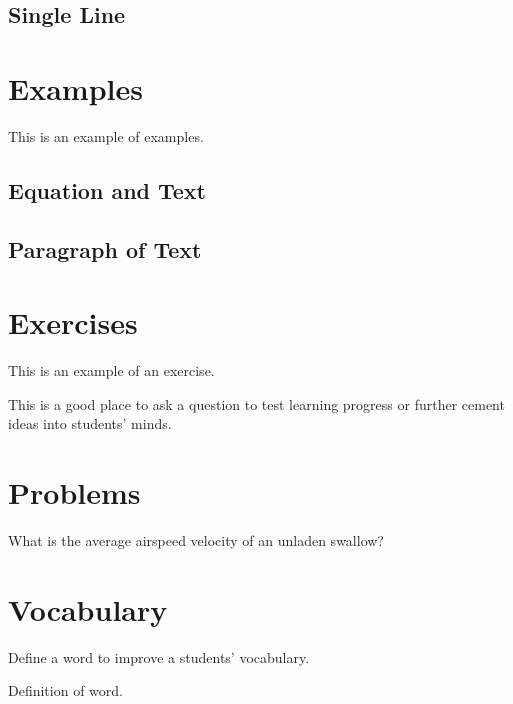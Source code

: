 \subsection{Single Line}


\section{Examples}

This is an example of examples.

\subsection{Equation and Text}


\subsection{Paragraph of Text}


\section{Exercises}

This is an example of an exercise.

\begin{exercise}
This is a good place to ask a question to test learning progress or further cement ideas into students' minds.
\end{exercise}


\section{Problems}

\begin{problem}
What is the average airspeed velocity of an unladen swallow?
\end{problem}


\section{Vocabulary}

Define a word to improve a students' vocabulary.

\begin{vocabulary}[Word]
Definition of word.
\end{vocabulary}
